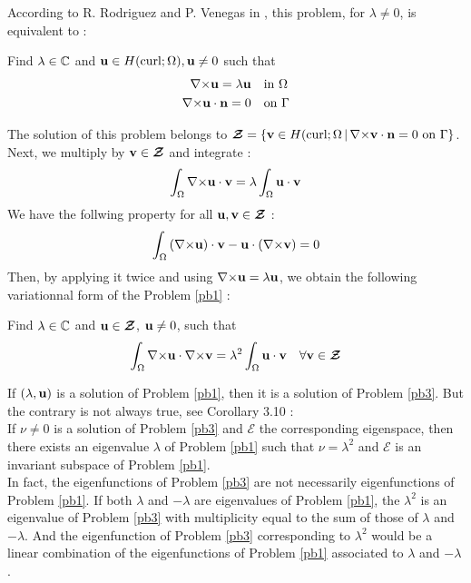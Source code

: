 According to R. Rodriguez and P. Venegas in \cite{Venegas2013}, this problem, for $\lambda\ne 0$, is
equivalent to :
\begin{pb}\label{pb2}
Find $\lambda\in{\mathbb{C}}$ and ${\mathbf{u}}\in
  H(\mathrm{curl};\Omega),{\mathbf{u}}\ne 0$ such that
\begin{align}
{\nabla\times} {\mathbf{u}} = \lambda {\mathbf{u}} & \quad \mbox{in }\Omega\\
{\nabla\times} {\mathbf{u}}\cdot{\mathbf{n}} = 0 & \quad \mbox{on }\Gamma
\end{align}
\end{pb}
The solution of this problem belongs to ${\bm{\mathcal{Z}}}=\{{\mathbf{v}}\in
H(\mathrm{curl};\Omega \,|\, {\nabla\times}{\mathbf{v}}\cdot{\mathbf{n}}=0 \mbox{
  on } \Gamma \}$.\\

Next, we multiply by ${\mathbf{v}}\in{\bm{\mathcal{Z}}}$ and integrate :
\[ \int_\Omega {\nabla\times}{\mathbf{u}}\cdot{\mathbf{v}} = \lambda\int_\Omega
{\mathbf{u}}\cdot{\mathbf{v}} \]
We have the follwing property for all ${\mathbf{u}},{\mathbf{v}}\in{\bm{\mathcal{Z}}}$ :
\[ \int_\Omega \left({\nabla\times}{\mathbf{u}}\right)\cdot{\mathbf{v}} -
{\mathbf{u}}\cdot\left({\nabla\times}{\mathbf{v}}\right) = 0 \]
Then, by applying it twice and using
${\nabla\times}{\mathbf{u}}=\lambda{\mathbf{u}}$, we obtain the following
variationnal form of the Problem \ref{pb1} :
\begin{pb}\label{pb3}
Find $\lambda\in{\mathbb{C}}$ and ${\mathbf{u}}\in{\bm{\mathcal{Z}}}$, ${\mathbf{u}}\ne 0$, such
that
\[ \int_\Omega {\nabla\times}{\mathbf{u}}\cdot{\nabla\times}{\mathbf{v}} =
\lambda^2\int_\Omega {\mathbf{u}}\cdot{\mathbf{v}} \quad \forall
{\mathbf{v}}\in{\bm{\mathcal{Z}}} \]
\end{pb}

If $(\lambda,{\mathbf{u}})$ is a solution of Problem \ref{pb1}, then it is a
solution of Problem \ref{pb3}. But the contrary is not always true,
see \cite{Venegas2013} Corollary 3.10 :\\

If $\nu\ne 0$ is a solution of Problem \ref{pb3} and $\bm{\mathcal{E}}$ the
corresponding eigenspace, then there exists an eigenvalue $\lambda$ of
Problem \ref{pb1} such that $\nu=\lambda^2$ and $\bm{\mathcal{E}}$ is an
invariant subspace of Problem \ref{pb1}.\\

In fact, the eigenfunctions of Problem \ref{pb3} are not necessarily
eigenfunctions of Problem \ref{pb1}. If both $\lambda$ and $-\lambda$
are eigenvalues of Problem \ref{pb1}, the $\lambda^2$ is an eigenvalue
of Problem \ref{pb3} with multiplicity equal to the sum of those of
$\lambda$ and $-\lambda$. And the eigenfunction of Problem \ref{pb3}
corresponding to $\lambda^2$ would be a linear combination of the
eigenfunctions of Problem \ref{pb1} associated to $\lambda$ and
$-\lambda$.\\

